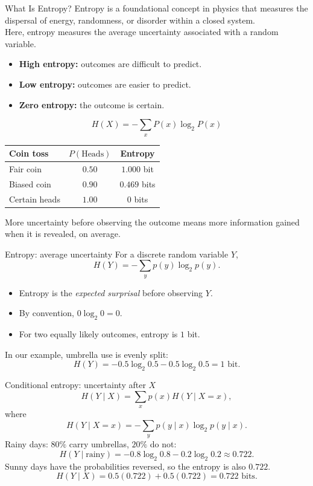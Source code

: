 \documentclass[aspectratio=43,11pt]{beamer}
\begin{document}
\begin{frame}{What Is Entropy?}
\small
Entropy is a foundational concept in physics that measures the dispersal of energy, randomness, or disorder within a closed system.\\
\medskip
Here, entropy measures the average uncertainty associated with a random variable.
\begin{itemize}
  \item {\textbf{High entropy:} outcomes are difficult to predict.}
  \item {\textbf{Low entropy:} outcomes are easier to predict.}
  \item {\textbf{Zero entropy:} the outcome is certain.}
\end{itemize}
\[
H(X)=-\sum_x P(x)\log_2 P(x)
\]
\vspace{-0.75em}
\begin{center}
\small
\begin{tabular}{lcc}
\toprule
\textbf{Coin toss} & \textbf{$P(\text{Heads})$} & \textbf{Entropy} \\
\midrule
Fair coin & $0.50$ & $1.000$ bit \\
Biased coin & $0.90$ & $0.469$ bits \\
Certain heads & $1.00$ & $0$ bits \\
\bottomrule
\end{tabular}
\end{center}
{More uncertainty before observing the outcome means more information gained when it is revealed, on average.}
\end{frame}

\begin{frame}{Entropy: average uncertainty}
For a discrete random variable $Y$,
\[
H(Y)=-\sum_y p(y)\log_2 p(y).
\]
\begin{itemize}
\item Entropy is the \emph{expected surprisal} before observing $Y$.
\item By convention, $0\log_2 0=0$.
\item For two equally likely outcomes, entropy is $1$ bit.
\end{itemize}
In our example, umbrella use is evenly split:
\[
H(Y)=-0.5\log_2 0.5-0.5\log_2 0.5=\boxed{1\text{ bit}}.
\]
\end{frame}

\begin{frame}{Conditional entropy: uncertainty after $X$}
\small
\[
H(Y\mid X)=\sum_x p(x)H(Y\mid X=x),
\]
where
\[
H(Y\mid X=x)=-\sum_y p(y\mid x)\log_2 p(y\mid x).
\]
Rainy days: $80\%$ carry umbrellas, $20\%$ do not:
\[
H(Y\mid\text{rainy})=-0.8\log_2 0.8-0.2\log_2 0.2
\approx 0.722.
\]
Sunny days have the probabilities reversed, so the entropy is also $0.722$.
\[
H(Y\mid X)=0.5(0.722)+0.5(0.722)=\boxed{0.722\text{ bits}}.
\]
\end{frame}
\end{document}
